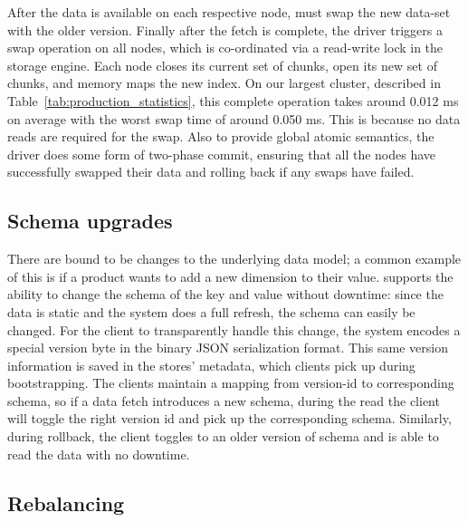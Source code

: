 After the data is available on each respective node, \projectname{} must swap
the new data-set with the older version. Finally after the fetch is
complete, the driver triggers a swap operation on all nodes, which is
co-ordinated via a read-write lock in the storage engine. Each node
closes its current set of chunks, open its new set of chunks, and
memory maps the new index. On our largest cluster, described in Table~\ref{tab:production_statistics}, 
this complete operation takes around 0.012 ms on average with the worst 
swap time of around 0.050 ms. This is because no data reads are required 
for the swap. Also to provide global atomic semantics, the driver does
some form of two-phase commit, ensuring that all the nodes have successfully 
swapped their data and rolling back if any swaps have failed.


\subsection{Schema upgrades}
\label{sec:read_only:data_cycle:schema_upgrades}

There are bound to be changes to the underlying data model; a common
example of this is if a product wants to add a new dimension to their
value. \projectname{} supports the ability to change the schema of the
key and value without downtime: since the data is static and the
system does a full refresh, the schema can easily be changed. For the
client to transparently handle this change, the system encodes a
special version byte in the binary JSON serialization format. This
same version information is saved in the stores' metadata, which
clients pick up during bootstrapping. The clients maintain a mapping
from version-id to corresponding schema, so if a data fetch introduces
a new schema, during the read the client will toggle the right version
id and pick up the corresponding schema. Similarly, during rollback,
the client toggles to an older version of schema and is able to read
the data with no downtime. 


\subsection{Rebalancing}
\label{sec:read_only:data_cycle:rebalancing}

